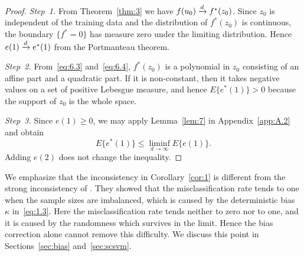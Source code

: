 \begin{proof}
\textit{Step~1.} From Theorem~\ref{thm:3} we have $f(u_0)\xrightarrow{d} f^*(z_0)$. Since
$z_0$ is independent of the training data and the distribution of $f^*(z_0)$ is
continuous, the boundary $\{f^*=0\}$ has measure zero under the limiting
distribution. Hence $e(1)\xrightarrow{d} e^*(1)$ from the Portmanteau theorem.

\textit{Step~2.} From~\eqref{eq:6.3} and~\eqref{eq:6.4}, $f^*(z_0)$ is a polynomial
in $z_0$ consisting of an affine part and a quadratic part. If it is non-constant,
then it takes negative values on a set of positive Lebesgue measure, and hence
$E\{e^*(1)\}>0$ because the support of $z_0$ is the whole space.

\textit{Step~3.} Since $e(1)\ge 0$, we may apply Lemma~\ref{lem:7} in
Appendix~\ref{app:A.2} and obtain
\[
E\{e^*(1)\}\le\liminf_{d\to\infty}E\{e(1)\}.
\]
Adding $e(2)$ does not change the inequality.
\end{proof}

\begin{remark}
\label{rem:5}
We emphasize that the inconsistency in Corollary~\ref{cor:1} is different from the
strong inconsistency of \citet{nakayama2017}. They showed that the
misclassification rate tends to one when the sample sizes are imbalanced, which is
caused by the deterministic bias $\kappa$ in~\eqref{eq:1.3}. Here the
misclassification rate tends neither to zero nor to one, and it is caused by the
randomness which survives in the limit. Hence the bias correction alone cannot
remove this difficulty. We discuss this point in Sections~\ref{sec:bias}
and~\ref{sec:scsvm}.
\end{remark}
